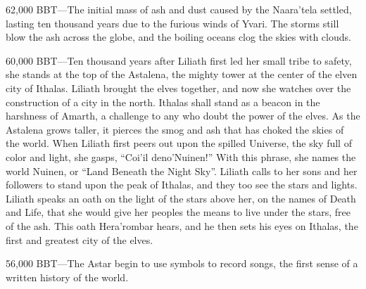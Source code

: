 \documentclass[smalldemyvopaper,11pt,twoside,onecolumn,openright,extrafontsizes]{memoir}
\begin{document}
{{62,000 BBT—The initial mass of ash and dust caused by the Naara’tela settled, lasting ten thousand years due to the furious winds of Yvari. The storms still blow the ash across the globe, and the boiling oceans clog the skies with clouds.

60,000 BBT—Ten thousand years after Liliath first led her small tribe to safety, she stands at the top of the Astalena, the mighty tower at the center of the elven city of Ithalas. Liliath brought the elves together, and now she watches over the construction of a city in the north. Ithalas shall stand as a beacon in the harshness of Amarth, a challenge to any who doubt the power of the elves. As the Astalena grows taller, it pierces the smog and ash that has choked the skies of the world. When Liliath first peers out upon the spilled Universe, the sky full of color and light, she gasps, “Coi’il deno’Nuinen!” With this phrase, she names the world Nuinen, or “Land Beneath the Night Sky”. Liliath calls to her sons and her followers to stand upon the peak of Ithalas, and they too see the stars and lights. Liliath speaks an oath on the light of the stars above her, on the names of Death and Life, that she would give her peoples the means to live under the stars, free of the ash. This oath Hera’rombar hears, and he then sets his eyes on Ithalas, the first and greatest city of the elves.

56,000 BBT—The Astar begin to use symbols to record songs, the first sense of a written history of the world.

}}
\end{document}
